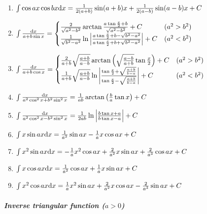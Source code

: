 \begin{tiny}
\begin{enumerate}
\item $ \int \cos ax \cos bx \mathrm{d} x =  \frac{1}{2(a+b)}\sin(a+b)x + \frac{1}{2(a-b)}\sin(a-b)x + C $

\item $ \int \frac{\mathrm{d} x}{a + b \sin x} = \begin{cases}
\frac{2}{\sqrt{a^2-b^2}}\arctan\frac{a\tan\frac{x}{2}+b}{\sqrt{a^2-b^2}} + C & (a^2 > b^2) \\
\frac{1}{\sqrt{b^2-a^2}}\ln \left| \frac{a\tan\frac{x}{2}+b-\sqrt{b^2-a^2}}{a\tan\frac{x}{2}+b+\sqrt{b^2-a^2}} \right| + C & (a^2 < b^2)
\end{cases} $

\item $ \int \frac{\mathrm{d} x}{a + b \cos x} = \begin{cases}
\frac{2}{a+b}\sqrt\frac{a+b}{a-b} \arctan\left(\sqrt\frac{a-b}{a+b}\tan\frac{x}{2}\right) + C & (a^2 > b^2) \\
\frac{1}{a+b}\sqrt\frac{a+b}{a-b} \ln \left| \frac{\tan\frac{x}{2}+\sqrt\frac{a+b}{b-a}}{\tan\frac{x}{2}-\sqrt\frac{a+b}{b-a}} \right| + C
& (a^2 < b^2)
\end{cases} $

\item $ \int \frac{\mathrm{d} x}{a^2\cos^2x+b^2\sin^2x} = \frac{1}{ab} \arctan\left( \frac{b}{a}\tan x \right) + C $

\item $ \int \frac{\mathrm{d} x}{a^2\cos^2x-b^2\sin^2x} = \frac{1}{2ab}\ln\left|\frac{b\tan x+a}{b\tan x-a}\right| + C $

\item $ \int x \sin ax \mathrm{d} x = \frac{1}{a^2} \sin ax - \frac{1}{a} x \cos ax + C $

\item $ \int x^2 \sin ax \mathrm{d} x = -\frac{1}{a} x^2 \cos ax + \frac{2}{a^2} x \sin ax + \frac{2}{a^3} \cos ax + C$

\item $ \int x \cos ax \mathrm{d} x = \frac{1}{a^2} \cos ax + \frac{1}{a} x \sin ax + C $

\item $ \int x^2 \cos ax \mathrm{d} x = \frac{1}{a} x^2 \sin ax + \frac{2}{a^2} x \cos ax - \frac{2}{a^3} \sin ax + C $

\end{enumerate}

\subparagraph{Inverse triangular function ($a>0$)}

\begin{enumerate}


\end{enumerate}
\end{tiny}
